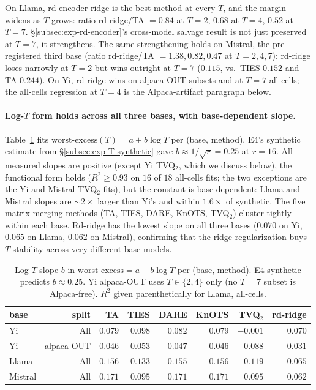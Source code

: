 On Llama, rd-encoder ridge is the best method at every $T$, and the
margin widens as $T$ grows: ratio rd-ridge/TA $= 0.84$ at $T = 2$,
$0.68$ at $T = 4$, $0.52$ at $T = 7$. \S\ref{subsec:exp-rd-encoder}'s
cross-model salvage result is not just preserved at $T = 7$, it
strengthens. The same strengthening holds on Mistral, the
pre-registered third base (ratio rd-ridge/TA $= 1.38, 0.82, 0.47$ at
$T = 2, 4, 7$): rd-ridge loses narrowly at $T = 2$ but wins outright
at $T = 7$ ($0.115$, vs.\ TIES $0.152$ and TA $0.244$). On Yi,
rd-ridge wins on alpaca-OUT subsets and at
$T = 7$ all-cells; the all-cells regression at $T = 4$ is the
Alpaca-artifact paragraph below.

\paragraph{Log-$T$ form holds across all three bases, with
base-dependent slope.}
Table~\ref{tab:e6-slopes} fits $\text{worst-excess}(T) = a + b \log T$
per (base, method). E4's synthetic estimate from
\S\ref{subsec:exp-T-synthetic} gave $b \approx 1 / \sqrt{r} = 0.25$
at $r = 16$. All measured slopes are positive (except Yi TVQ$_2$,
which we discuss below), the functional form holds
($R^2 \geq 0.93$ on $16$ of $18$ all-cells fits; the two exceptions
are the Yi and Mistral TVQ$_2$ fits), but the constant is
base-dependent: Llama and Mistral slopes are $\sim 2 \times$ larger
than Yi's and within $1.6 \times$ of synthetic. The five
matrix-merging methods (TA, TIES, DARE, KnOTS, TVQ$_2$) cluster
tightly within each base. Rd-ridge has the lowest slope on all three
bases ($0.070$ on Yi, $0.065$ on Llama, $0.062$ on Mistral),
confirming that the ridge regularization buys $T$-stability across
very different base models.

\begin{table}[t]
\centering
\caption{Log-$T$ slope $b$ in $\text{worst-excess} = a + b \log T$ per
(base, method). E4 synthetic predicts $b \approx 0.25$. Yi
alpaca-OUT uses $T \in \{2, 4\}$ only (no $T = 7$ subset is
Alpaca-free). $R^2$ given parenthetically for Llama, all-cells.}
\label{tab:e6-slopes}
\begin{tabular}{lr|rrrrrr}
\hline
base & split & TA & TIES & DARE & KnOTS & TVQ$_2$ & rd-ridge \\
\hline
Yi    & All        & $0.079$ & $0.098$ & $0.082$ & $0.079$ & $-0.001$ & $0.070$ \\
Yi    & alpaca-OUT & $0.046$ & $0.053$ & $0.047$ & $0.046$ & $-0.088$ & $0.031$ \\
Llama & All        & $0.156$ & $0.133$ & $0.155$ & $0.156$ & $0.119$ & $\mathbf{0.065}$ \\
Mistral & All      & $0.171$ & $0.095$ & $0.171$ & $0.171$ & $0.095$ & $\mathbf{0.062}$ \\
\hline
\end{tabular}
\end{table}

